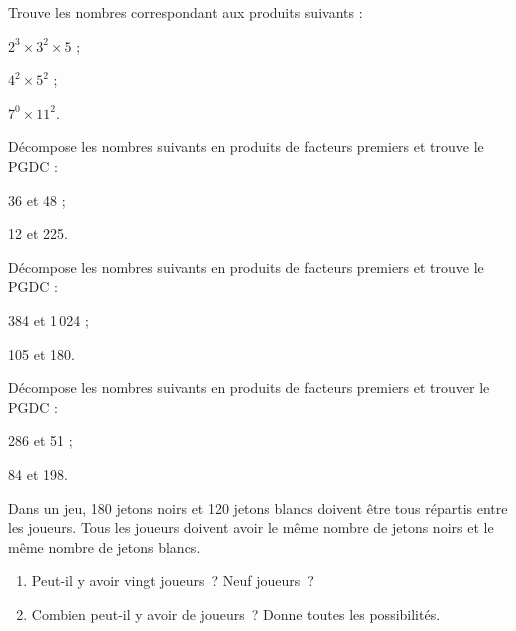 \begin{exercice}
Trouve les nombres correspondant aux produits suivants :
\begin{colenumerate}{3}
 \item $2^3 \times 3^2 \times 5$ ;
 \item $4^2 \times 5^2$ ;
 \item $7^0 \times 11^2$.
 \end{colenumerate}
\end{exercice} 

\begin{exercice}
Décompose les nombres suivants en produits de facteurs premiers et trouve le PGDC :
\begin{colenumerate}{2}
 \item 36 et 48 ;
 \item 12 et 225.
 \end{colenumerate}
\end{exercice} 

\begin{exercice}
Décompose les nombres suivants en produits de facteurs premiers et trouve le PGDC :
\begin{colenumerate}{2}
 \item 384 et 1\,024 ;
 \item 105 et 180.
 \end{colenumerate}
\end{exercice} 

\begin{exercice}
Décompose les nombres suivants en produits de facteurs premiers et trouver le PGDC :
\begin{colenumerate}{2}
 \item 286 et 51 ;
 \item 84 et 198.
 \end{colenumerate}
\end{exercice} 

\begin{exercice}
Dans un jeu, 180 jetons noirs et 120 jetons blancs doivent être tous répartis entre les joueurs. Tous les joueurs doivent avoir le même nombre de jetons noirs et le même nombre de jetons blancs.
\begin{enumerate}
 \item Peut-il y avoir vingt joueurs ? Neuf joueurs ?
 \item Combien peut-il y avoir de joueurs ? Donne toutes les possibilités.
 \end{enumerate}
\end{exercice} 

